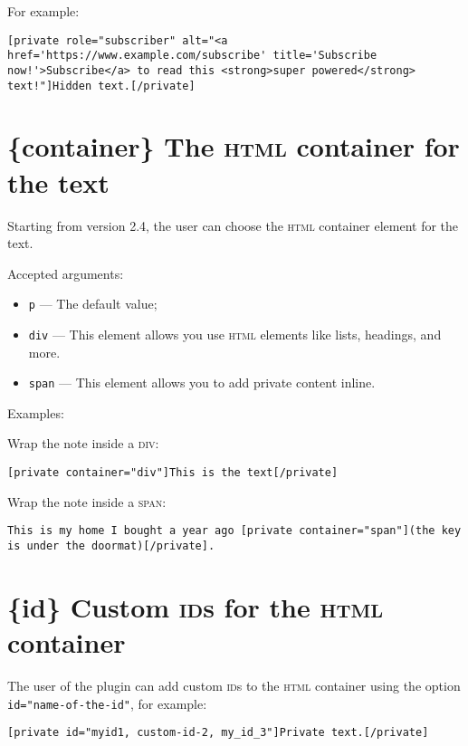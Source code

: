 For example:

\begin{lstlisting}
[private role="subscriber" alt="<a href='https://www.example.com/subscribe' title='Subscribe now!'>Subscribe</a> to read this <strong>super powered</strong> text!"]Hidden text.[/private]
\end{lstlisting}

\section{\{container\} The \textsc{html} container for the text}

Starting from version 2.4, the user can choose the \textsc{html} container
element for the text.

Accepted arguments:

\begin{itemize}
 \item \verb+p+ --- The default value;
 \item \verb+div+ --- This element allows you use \textsc{html} elements like
 lists, headings, and more.
 \item \verb+span+ --- This element allows you to add private content inline.
\end{itemize}

Examples:

Wrap the note inside a \textsc{div}:

\begin{lstlisting}
[private container="div"]This is the text[/private]
\end{lstlisting}

Wrap the note inside a \textsc{span}:

\begin{lstlisting}
This is my home I bought a year ago [private container="span"](the key is under the doormat)[/private].
\end{lstlisting}


\section{\{id\} Custom \textsc{id}s for the \textsc{html} container}

The user of the plugin can add custom \textsc{id}s to the \textsc{html}
container using the option \verb+id="name-of-the-id"+, for example:

\begin{lstlisting}
[private id="myid1, custom-id-2, my_id_3"]Private text.[/private]
\end{lstlisting}

